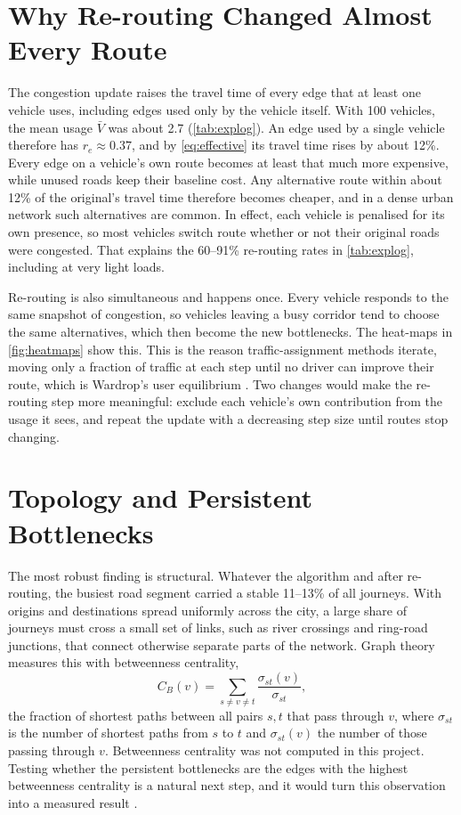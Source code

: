 \documentclass[12pt]{report}
\begin{document}
\section{Why Re-routing Changed Almost Every Route}
\label{sec:disc-reroute}

The congestion update raises the travel time of every edge that at least one vehicle uses, including edges used only by the vehicle itself. With 100 vehicles, the mean usage $\bar{V}$ was about 2.7 (\cref{tab:explog}). An edge used by a single vehicle therefore has $r_e \approx 0.37$, and by \cref{eq:effective} its travel time rises by about 12\%. Every edge on a vehicle's own route becomes at least that much more expensive, while unused roads keep their baseline cost. Any alternative route within about 12\% of the original's travel time therefore becomes cheaper, and in a dense urban network such alternatives are common. In effect, each vehicle is penalised for its own presence, so most vehicles switch route whether or not their original roads were congested. That explains the 60--91\% re-routing rates in \cref{tab:explog}, including at very light loads.

Re-routing is also simultaneous and happens once. Every vehicle responds to the same snapshot of congestion, so vehicles leaving a busy corridor tend to choose the same alternatives, which then become the new bottlenecks. The heat-maps in \cref{fig:heatmaps} show this. This is the reason traffic-assignment methods iterate, moving only a fraction of traffic at each step until no driver can improve their route, which is Wardrop's user equilibrium \citep{wardrop1952,sheffi1985urban}. Two changes would make the re-routing step more meaningful: exclude each vehicle's own contribution from the usage it sees, and repeat the update with a decreasing step size until routes stop changing.

\section{Topology and Persistent Bottlenecks}

The most robust finding is structural. Whatever the algorithm and after re-routing, the busiest road segment carried a stable 11--13\% of all journeys. With origins and destinations spread uniformly across the city, a large share of journeys must cross a small set of links, such as river crossings and ring-road junctions, that connect otherwise separate parts of the network. Graph theory measures this with betweenness centrality,
\begin{equation}
C_B(v) = \sum_{s \neq v \neq t} \frac{\sigma_{st}(v)}{\sigma_{st}},
\end{equation}
the fraction of shortest paths between all pairs $s, t$ that pass through $v$, where $\sigma_{st}$ is the number of shortest paths from $s$ to $t$ and $\sigma_{st}(v)$ the number of those passing through $v$. Betweenness centrality was not computed in this project. Testing whether the persistent bottlenecks are the edges with the highest betweenness centrality is a natural next step, and it would turn this observation into a measured result \citep{barthelemy2011spatial}.
\end{document}
